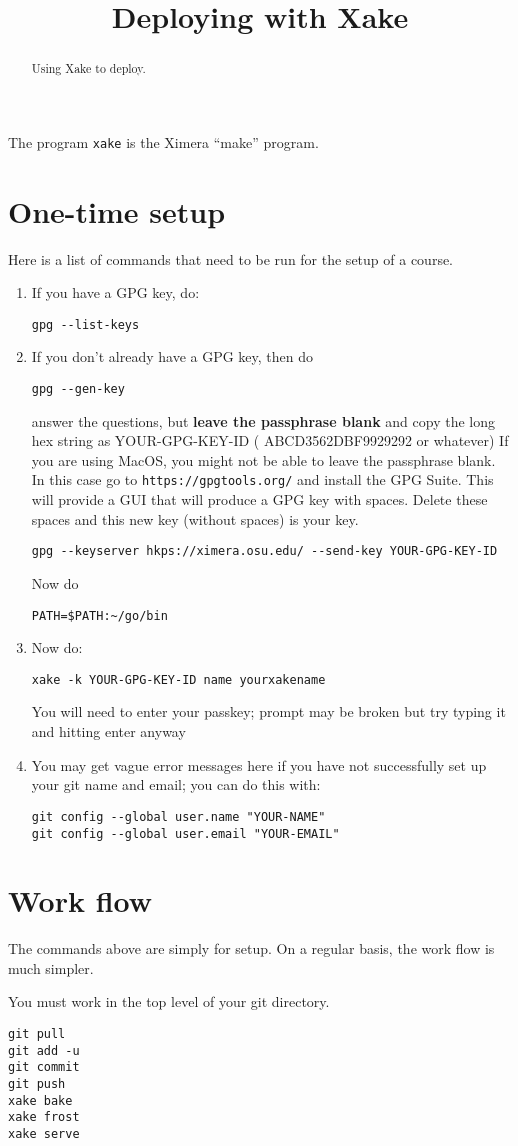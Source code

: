 \documentclass{ximera}
\title{Deploying with Xake}
\begin{document}
\begin{abstract}
Using Xake to deploy.
\end{abstract}
\maketitle

The program \verb|xake| is the Ximera ``make'' program.

\section{One-time setup}

Here is a list of commands that need to be run for the setup of a course. 

\begin{enumerate}
\item If you have a GPG key, do:
\begin{verbatim}
gpg --list-keys
\end{verbatim}
\item If you don’t already have a GPG key, then do
\begin{verbatim}
gpg --gen-key
\end{verbatim}
answer the questions, but \textbf{leave the passphrase blank} and copy
the long hex string as YOUR-GPG-KEY-ID ( ABCD3562DBF9929292 or
whatever) If you are using MacOS, you might not be able to leave the
passphrase blank. In this case go to \verb|https://gpgtools.org/| and
install the GPG Suite.  This will provide a GUI that will produce a
GPG key with spaces. Delete these spaces and this new key (without
spaces) is your key.

\begin{verbatim}
gpg --keyserver hkps://ximera.osu.edu/ --send-key YOUR-GPG-KEY-ID
\end{verbatim}
Now do
\begin{verbatim}
PATH=$PATH:~/go/bin
\end{verbatim}
\item Now do: 
\begin{verbatim}
xake -k YOUR-GPG-KEY-ID name yourxakename
\end{verbatim}
You will need to enter your passkey; prompt may be broken but try typing it and hitting enter anyway

\item You may get vague error messages here if you have not successfully set up your git name and email; you can do this with:
\begin{verbatim}
git config --global user.name "YOUR-NAME"
git config --global user.email "YOUR-EMAIL"
\end{verbatim}
\end{enumerate}


\section{Work flow}

The commands above are simply for setup. On a regular basis, the work flow is much simpler.

You must work in the top level of your git directory.
\begin{verbatim}
git pull
git add -u
git commit
git push
xake bake
xake frost
xake serve
\end{verbatim}




  
\end{document}
